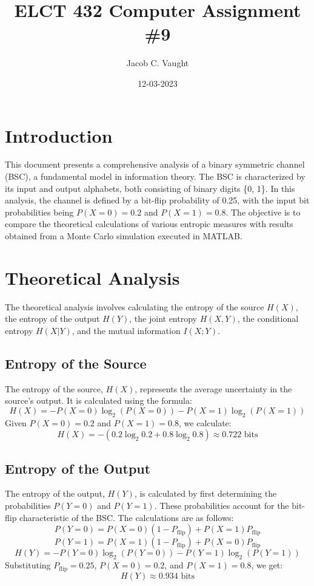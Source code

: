 \documentclass{article}
\title{ELCT 432 Computer Assignment \#9}
\author{Jacob C. Vaught}
\date{12-03-2023}
\begin{document}
\maketitle

\section{Introduction}
This document presents a comprehensive analysis of a binary symmetric channel (BSC), a fundamental model in information theory. The BSC is characterized by its input and output alphabets, both consisting of binary digits \{0, 1\}. In this analysis, the channel is defined by a bit-flip probability of 0.25, with the input bit probabilities being \( P(X=0) = 0.2 \) and \( P(X=1) = 0.8 \). The objective is to compare the theoretical calculations of various entropic measures with results obtained from a Monte Carlo simulation executed in MATLAB.

\section{Theoretical Analysis}
The theoretical analysis involves calculating the entropy of the source \( H(X) \), the entropy of the output \( H(Y) \), the joint entropy \( H(X, Y) \), the conditional entropy \( H(X|Y) \), and the mutual information \( I(X; Y) \).

\subsection{Entropy of the Source}
The entropy of the source, \( H(X) \), represents the average uncertainty in the source's output. It is calculated using the formula:
\[ H(X) = -P(X=0)\log_2(P(X=0)) - P(X=1)\log_2(P(X=1)) \]
Given \( P(X=0) = 0.2 \) and \( P(X=1) = 0.8 \), we calculate:
\[ H(X) = -(0.2 \log_2 0.2 + 0.8 \log_2 0.8) \approx 0.722 \text{ bits} \]

\subsection{Entropy of the Output}
The entropy of the output, \( H(Y) \), is calculated by first determining the probabilities \( P(Y=0) \) and \( P(Y=1) \). These probabilities account for the bit-flip characteristic of the BSC. The calculations are as follows:
\[ P(Y=0) = P(X=0)(1-P_{\text{flip}}) + P(X=1)P_{\text{flip}} \]
\[ P(Y=1) = P(X=1)(1-P_{\text{flip}}) + P(X=0)P_{\text{flip}} \]
\[ H(Y) = -P(Y=0)\log_2(P(Y=0)) - P(Y=1)\log_2(P(Y=1)) \]
Substituting \( P_{\text{flip}} = 0.25 \), \( P(X=0) = 0.2 \), and \( P(X=1) = 0.8 \), we get:
\[ H(Y) \approx 0.934 \text{ bits} \]
\end{document}
